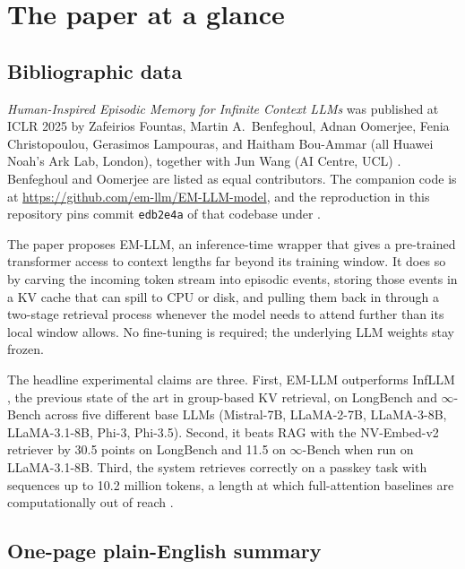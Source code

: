 \section{The paper at a glance}
\label{sec:paper-overview}

\subsection{Bibliographic data}
\label{sec:bib}

\emph{Human-Inspired Episodic Memory for Infinite Context LLMs} was published at ICLR 2025 by Zafeirios Fountas, Martin A.\ Benfeghoul, Adnan Oomerjee, Fenia Christopoulou, Gerasimos Lampouras, and Haitham Bou-Ammar (all Huawei Noah's Ark Lab, London), together with Jun Wang (AI Centre, UCL) \cite{fountas2025emllm}. Benfeghoul and Oomerjee are listed as equal contributors. The companion code is at \url{https://github.com/em-llm/EM-LLM-model}, and the reproduction in this repository pins commit \texttt{edb2e4a} of that codebase under .

The paper proposes EM-LLM, an inference-time wrapper that gives a pre-trained transformer access to context lengths far beyond its training window. It does so by carving the incoming token stream into episodic events, storing those events in a KV cache that can spill to CPU or disk, and pulling them back in through a two-stage retrieval process whenever the model needs to attend further than its local window allows. No fine-tuning is required; the underlying LLM weights stay frozen.

The headline experimental claims are three. First, EM-LLM outperforms InfLLM \cite{xiao2024infllm}, the previous state of the art in group-based KV retrieval, on LongBench \cite{bai2023longbench} and $\infty$-Bench \cite{zhang2024infbench} across five different base LLMs (Mistral-7B, LLaMA-2-7B, LLaMA-3-8B, LLaMA-3.1-8B, Phi-3, Phi-3.5). Second, it beats RAG with the NV-Embed-v2 retriever \cite{lee2024nvembed} by 30.5 points on LongBench and 11.5 on $\infty$-Bench when run on LLaMA-3.1-8B. Third, the system retrieves correctly on a passkey task with sequences up to 10.2 million tokens, a length at which full-attention baselines are computationally out of reach \cite{ding2024longrope}.

\subsection{One-page plain-English summary}
\label{sec:summary}

